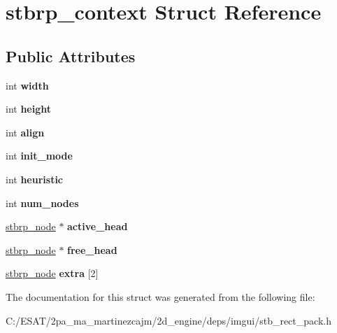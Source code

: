 \hypertarget{structstbrp__context}{}\section{stbrp\+\_\+context Struct Reference}
\label{structstbrp__context}
\subsection*{Public Attributes}
\begin{DoxyCompactItemize}
\item 
\mbox{\label{structstbrp__context_a70cfcb2044ce8397cc440d28b30c09b2}} 
int {\bfseries width}
\item 
\mbox{\label{structstbrp__context_af3715a6f3faecfb4fac8f6ccbb71f9c7}} 
int {\bfseries height}
\item 
\mbox{\label{structstbrp__context_ae36053e2001a725aec2b5756dc990481}} 
int {\bfseries align}
\item 
\mbox{\label{structstbrp__context_a007509feee322404083034e4c2d3dc5d}} 
int {\bfseries init\+\_\+mode}
\item 
\mbox{\label{structstbrp__context_a4b61a7f94e50a54c075e2a8f99f6503a}} 
int {\bfseries heuristic}
\item 
\mbox{\label{structstbrp__context_afa8105d4ef6d3e0ae5aaf8e1ed4b2c58}} 
int {\bfseries num\+\_\+nodes}
\item 
\mbox{\label{structstbrp__context_a13277239636803aff28f00b0a0376120}} 
\hyperlink{structstbrp__node}{stbrp\+\_\+node} $\ast$ {\bfseries active\+\_\+head}
\item 
\mbox{\label{structstbrp__context_a1336ae32373663847866cc65904c2839}} 
\hyperlink{structstbrp__node}{stbrp\+\_\+node} $\ast$ {\bfseries free\+\_\+head}
\item 
\mbox{\label{structstbrp__context_a0b80e1fbdac125427526f3500d4e7624}} 
\hyperlink{structstbrp__node}{stbrp\+\_\+node} {\bfseries extra} \mbox{[}2\mbox{]}
\end{DoxyCompactItemize}


The documentation for this struct was generated from the following file\+:\begin{DoxyCompactItemize}
\item 
C\+:/\+E\+S\+A\+T/2pa\+\_\+ma\+\_\+martinezcajm/2d\+\_\+engine/deps/imgui/stb\+\_\+rect\+\_\+pack.\+h\end{DoxyCompactItemize}
